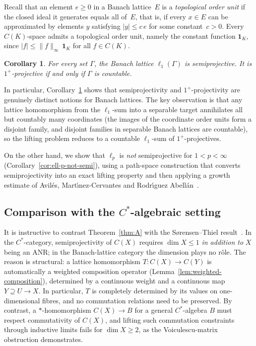\documentclass[11pt]{amsart}
\renewcommand{\le}{\leqslant}
\renewcommand{\ge}{\geqslant}
\numberwithin{equation}{section}
\newtheorem{corollary}[theorem]{Corollary}
\theoremstyle{definition}
\theoremstyle{remark}
\theoremstyle{plain}
\begin{document}
Recall that an element $e\ge 0$ in a Banach lattice~$E$ is a
\emph{topological order unit} if the closed ideal it generates equals all of~$E$,
that is, if every $x\in E$ can be approximated by elements $y$ satisfying $|y|\le c\,e$
for some constant~$c>0$.
Every $C(K)$-space admits a topological order unit, namely the constant function
$\mathbf{1}_K$, since $|f|\le \|f\|_\infty\,\mathbf{1}_K$ for all $f\in C(K)$.

\begin{corollary}\label{cor:l1-Gamma-intro}
For every set\/ $\Gamma$, the Banach lattice $\ell_1(\Gamma)$ is semiprojective.
It is $1^+$-projective if and only if\/ $\Gamma$ is countable.
\end{corollary}

In particular, Corollary~\ref{cor:l1-Gamma-intro} shows that semiprojectivity and
$1^+$-projectivity are genuinely distinct notions for Banach lattices.
The key observation is that any lattice homomorphism from the $\ell_1$-sum
into a separable target annihilates all but countably many coordinates
(the images of the coordinate order units form a disjoint family,
and disjoint families in separable Banach lattices are countable),
so the lifting problem reduces to a countable $\ell_1$-sum of $1^+$-projectives.

On the other hand, we show that $\ell_p$ is \emph{not} semiprojective for $1<p<\infty$
(Corollary~\ref{cor:ell-p-not-semi}),
using a path-space construction that converts semiprojectivity into an exact lifting
property and then applying a growth estimate of
Avil\'es, Mart\'{\i}nez-Cervantes and Rodr\'{\i}guez Abell\'an~\cite{avilaes-c0}.

\subsection*{Comparison with the $C^*$-algebraic setting}
It is instructive to contrast Theorem~\ref{thm:A} with the S\o rensen--Thiel
result~\cite{sorensen-thiel}.
In the $C^*$-category, semiprojectivity of $C(X)$ requires $\dim X\le 1$
\emph{in addition to} $X$ being an ANR;
in the Banach-lattice category the dimension plays no r\^ole.
The reason is structural:
a lattice homomorphism $T\colon C(X)\to C(Y)$ is automatically a weighted composition operator
(Lemma~\ref{lem:weighted-composition}), determined by a continuous weight and a continuous map $Y\supseteq U\to X$.
In particular, $T$ is completely determined by its values on one-dimensional fibres,
and no commutation relations need to be preserved.
By contrast, a $*$-homomorphism $C(X)\to B$ for a general $C^*$-algebra $B$
must respect commutativity of $C(X)$, and lifting such commutation constraints
through inductive limits fails for $\dim X\ge 2$, as the Voiculescu-matrix obstruction
demonstrates.
\end{document}
